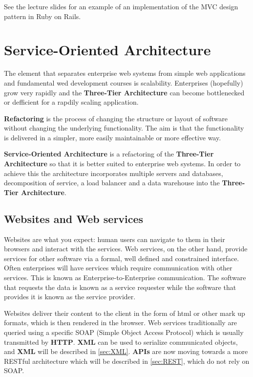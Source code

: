 \documentclass[11pt]{article}
\begin{document}
See the lecture slides for an example of an implementation of the MVC design pattern in Ruby on Rails.



\section{Service-Oriented Architecture}
\label{sec:SOA}

The element that separates enterprise web systems from simple web applications and fundamental wed development courses is scalability. Enterprises (hopefully) grow very rapidly and the \textbf{Three-Tier Architecture} can become bottlenecked or defficient for a rapdily scaling application.

\textbf{Refactoring} is the process of changing the structure or layout of software without changing the underlying functionality. The aim is that the functionality is delivered in a simpler, more easily maintainable or more effective way.

\textbf{Service-Oriented Architecture} is a refactoring of the \textbf{Three-Tier Architecture} so that it is better suited to enterprise web systems. In order to achieve this the architecture incorporates multiple servers and databases, decomposition of service, a load balancer and a data warehouse into the \textbf{Three-Tier Architecture}.

\subsection{Websites and Web services}

Websites are what you expect: human users can navigate to them in their browsers and interact with the services. Web services, on the other hand, provide services for other software via a formal, well defined and constrained interface. Often enterprises will have services which require communication with other services. This is known as Enterprise-to-Enterprise communication. The software that requests the data is known as a service requester while the software that provides it is known as the service provider.

Websites deliver their content to the client in the form of html or other mark up formats, which is then rendered in the browser. Web services traditionally are queried using a specific SOAP (Simple Object Access Protocol) which is usually transmitted by \textbf{HTTP}. \textbf{XML }can be used to serialize communicated objects, and \textbf{XML} will be described in \ref{sec:XML}. \textbf{APIs} are now moving towards a more RESTful architecture which will be described in \ref{sec:REST}, which do not rely on SOAP.
\end{document}
